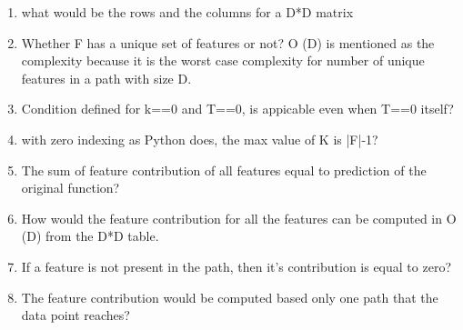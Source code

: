 \documentclass{article}
\begin{document}
\begin{enumerate}
        \item what would be the rows and the columns for a D*D matrix
        \item Whether F has a unique set of features or not? O (D) is mentioned as the complexity because it is the worst case complexity for number of unique features in a path with size D.
        \item Condition defined for k==0 and T==0, is appicable even when T==0 itself?
        \item with zero indexing as Python does, the max value of K is |F|-1?
        \item The sum of feature contribution of all features equal to prediction of the original function?
        \item How would the feature contribution for all the features can be computed in O (D) from the D*D table. 
        \item If a feature is not present in the path, then it's contribution is equal to zero?
        \item The feature contribution would be computed based only one path that the data point reaches?
\end{enumerate}
\end{document}
